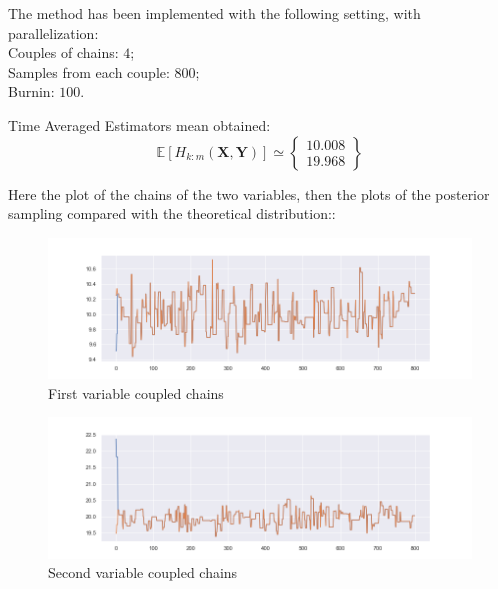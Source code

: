 \documentclass {article}
\begin{document}
The method has been implemented with the following setting, with parallelization:\\
Couples of chains: $4$;\\
Samples from each couple: $800$;\\
Burnin: $100$.



Time Averaged Estimators mean obtained:
$$ \mathbb{E}[H_{k:m}(\boldsymbol{X},\boldsymbol{Y})] \simeq \begin{Bmatrix}    %
10.008 \\
19.968
\end{Bmatrix}$$

Here the plot of the chains of the two variables, then the plots of the posterior sampling compared with the theoretical distribution::
\begin{figure}[h!]
	\centering
	\includegraphics[width=\textwidth]{immagini_coupling_multivariate/coupling_mult_chain_meeeting_1}	
	\caption{First variable coupled chains}
\end{figure}

\begin{figure}[h!]
	\centering
	\includegraphics[width=\textwidth]{immagini_coupling_multivariate/coupling_mult_chain_meeeting_2}	
	\caption{Second variable coupled chains}
\end{figure}
\end{document}

